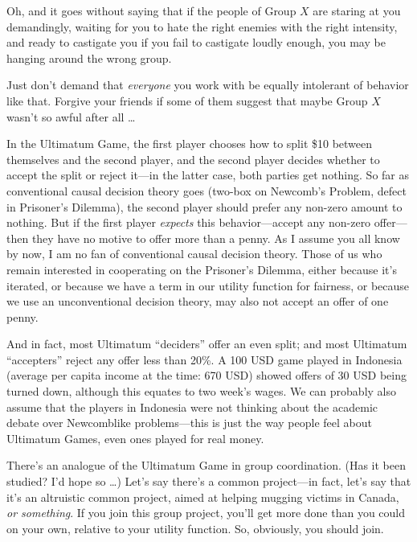 {
 Oh, and it goes without saying that if the people of Group $X$ are
staring at you demandingly, waiting for you to hate the right enemies
with the right intensity, and ready to castigate you if you fail to
castigate loudly enough, you may be hanging around the wrong group.}

{
 Just don't demand that \textit{everyone} you work
with be equally intolerant of behavior like that. Forgive your friends
if some of them suggest that maybe Group $X$ wasn't so
awful after all \ldots}

\myendsectiontext


{
 In the Ultimatum Game, the first player chooses how to split \$10
between themselves and the second player, and the second player decides
whether to accept the split or reject it---in the latter case, both
parties get nothing. So far as conventional causal decision theory goes
(two-box on Newcomb's Problem, defect in
Prisoner's Dilemma), the second player should prefer
any non-zero amount to nothing. But if the first player
\textit{expects} this behavior---accept any non-zero offer---then they
have no motive to offer more than a penny. As I assume you all know by
now, I am no fan of conventional causal decision theory. Those of us
who remain interested in cooperating on the Prisoner's
Dilemma, either because it's iterated, or because we
have a term in our utility function for fairness, or because we use an
unconventional decision theory, may also not accept an offer of one
penny. }

{
 And in fact, most Ultimatum
``deciders'' offer an even split;
and most Ultimatum ``accepters''
reject any offer less than 20\%. A 100 USD game played in Indonesia
(average per capita income at the time: 670 USD) showed offers of 30
USD being turned down, although this equates to two
week's wages. We can probably also assume that the
players in Indonesia were not thinking about the academic debate over
Newcomblike problems---this is just the way people feel about Ultimatum
Games, even ones played for real money.}

{
 There's an analogue of the Ultimatum Game in group
coordination. (Has it been studied? I'd hope so \ldots)
Let's say there's a common project---in
fact, let's say that it's an altruistic
common project, aimed at helping mugging victims in Canada, \textit{or
something}. If you join this group project, you'll get
more done than you could on your own, relative to your utility
function. So, obviously, you should join.}

